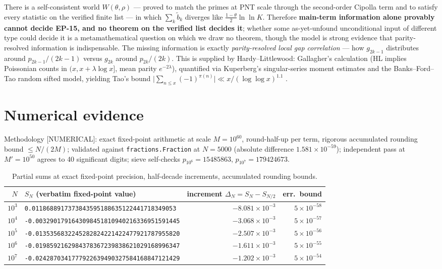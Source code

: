 \documentclass[11pt]{article}
\theoremstyle{definition}
\begin{document}
There is a self-consistent world $W(\theta,\rho)$ --- proved to match the primes at PNT scale through the second-order Cipolla term and to satisfy every statistic on the verified finite list --- in which $\sum_k\tilde b_k$ diverges like $\frac{1-\theta}{2}\ln\ln K$. Therefore \textbf{main-term information alone provably cannot decide EP-15, and no theorem on the verified list decides it}; whether some as-yet-unfound unconditional input of different type could decide it is a metamathematical question on which we draw no theorem, though the model is strong evidence that parity-resolved information is indispensable. The missing information is exactly \emph{parity-resolved local gap correlation} --- how $g_{2k-1}$ distributes around $p_{2k-1}/(2k-1)$ versus $g_{2k}$ around $p_{2k}/(2k)$. This is supplied by Hardy--Littlewood: Gallagher's calculation (HL implies Poissonian counts in $(x,x+\lambda\log x]$, mean parity $e^{-2\lambda}$), quantified via Kuperberg's singular-series moment estimates and the Banks--Ford--Tao random sifted model, yielding Tao's bound $\bigl|\sum_{n\le x}(-1)^{\pi(n)}\bigr|\ll x/(\log\log x)^{1.1}$ \cite{Ta23}.

\section{Numerical evidence}\label{sec:num}

Methodology \textnormal{[NUMERICAL]}: exact fixed-point arithmetic at scale $M=10^{60}$, round-half-up per term, rigorous accumulated rounding bound $\le N/(2M)$; validated against \texttt{fractions.Fraction} at $N=5000$ (absolute difference $1.581\times10^{-59}$); independent pass at $M'=10^{50}$ agrees to 40 significant digits; sieve self-checks $p_{10^6}=15485863$, $p_{10^7}=179424673$.

\begin{table}[h]
\centering\footnotesize
\begin{tabular}{@{}rlrr@{}}
\toprule
$N$ & $S_N$ (verbatim fixed-point value) & increment $\Delta_N=S_N-S_{N/2}$ & err.\ bound\\
\midrule
$10^3$ & \texttt{0.0118688917373843595188635122441718349053} & $-8.081\times10^{-3}$ & $5\times10^{-58}$\\
$10^4$ & \texttt{-0.0032901791643098451810940216336951591445} & $-3.068\times10^{-3}$ & $5\times10^{-57}$\\
$10^5$ & \texttt{-0.0135356832245282824221422477921787955820} & $-2.507\times10^{-3}$ & $5\times10^{-56}$\\
$10^6$ & \texttt{-0.0198592162984378367239838621029168996347} & $-1.611\times10^{-3}$ & $5\times10^{-55}$\\
$10^7$ & \texttt{-0.0242870341777922639490327584168847121429} & $-1.202\times10^{-3}$ & $5\times10^{-54}$\\
\bottomrule
\end{tabular}
\caption{Partial sums at exact fixed-point precision, half-decade increments, accumulated rounding bounds.}
\label{tab:S}
\end{table}
\end{document}
